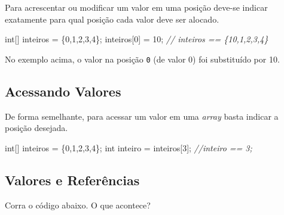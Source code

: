 \documentclass[
]{book}
\newenvironment{Shaded}{\begin{snugshade}}{\end{snugshade}}
\newcommand{\CommentTok}[1]{\textcolor[rgb]{0.56,0.35,0.01}{\textit{#1}}}
\newcommand{\DataTypeTok}[1]{\textcolor[rgb]{0.13,0.29,0.53}{#1}}
\newcommand{\DecValTok}[1]{\textcolor[rgb]{0.00,0.00,0.81}{#1}}
\newcommand{\NormalTok}[1]{#1}
\begin{document}
Para acrescentar ou modificar um valor em uma posição deve-se indicar exatamente para qual posição cada valor deve ser alocado.

\begin{Shaded}
\begin{Highlighting}[]
\DataTypeTok{int}\NormalTok{[] inteiros = \{}\DecValTok{0}\NormalTok{,}\DecValTok{1}\NormalTok{,}\DecValTok{2}\NormalTok{,}\DecValTok{3}\NormalTok{,}\DecValTok{4}\NormalTok{\};}
\NormalTok{inteiros[}\DecValTok{0}\NormalTok{] = }\DecValTok{10}\NormalTok{;}
\CommentTok{// inteiros == \{10,1,2,3,4\}}
\end{Highlighting}
\end{Shaded}

No exemplo acima, o valor na posição \texttt{0} (de valor 0) foi substituído por 10.

\hypertarget{acessando-valores}{%
\subsection{Acessando Valores}\label{acessando-valores}}

De forma semelhante, para acessar um valor em uma \emph{array} basta indicar a posição desejada.

\begin{Shaded}
\begin{Highlighting}[]
\DataTypeTok{int}\NormalTok{[] inteiros = \{}\DecValTok{0}\NormalTok{,}\DecValTok{1}\NormalTok{,}\DecValTok{2}\NormalTok{,}\DecValTok{3}\NormalTok{,}\DecValTok{4}\NormalTok{\};}
\DataTypeTok{int}\NormalTok{ inteiro = inteiros[}\DecValTok{3}\NormalTok{];}
\CommentTok{//inteiro == 3;}
\end{Highlighting}
\end{Shaded}

\hypertarget{valores-e-referuxeancias}{%
\subsection{Valores e Referências}\label{valores-e-referuxeancias}}

Corra o código abaixo. O que acontece?
\end{document}
